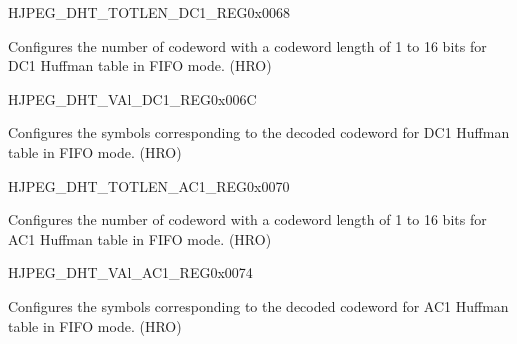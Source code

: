 \begin{register}{H}{JPEG\_DHT\_TOTLEN\_DC1\_REG}{0x0068}\label{regdesc:JPEGDHTTOTLENDC1REG}
%
\regnewline%
\begin{regdesc}\begin{reglist}
\label{fielddesc:JPEGDHTTOTLENDC1}\item [JPEG\_DHT\_TOTLEN\_DC1] Configures the number of codeword with a codeword length of 1 to 16 bits for DC1 Huffman table in FIFO mode. (HRO)
\end{reglist}\end{regdesc}
\end{register}


\begin{register}{H}{JPEG\_DHT\_VAl\_DC1\_REG}{0x006C}\label{regdesc:JPEGDHTVALDC1REG}
%
\regnewline%
\begin{regdesc}\begin{reglist}
\label{fielddesc:JPEGDHTVALDC1}\item [JPEG\_DHT\_VAL\_DC1] Configures the symbols corresponding to the decoded codeword for DC1 Huffman table in FIFO mode. (HRO)
\end{reglist}\end{regdesc}
\end{register}


\begin{register}{H}{JPEG\_DHT\_TOTLEN\_AC1\_REG}{0x0070}\label{regdesc:JPEGDHTTOTLENAC1REG}
%
\regnewline%
\begin{regdesc}\begin{reglist}
\label{fielddesc:JPEGDHTTOTLENAC1}\item [JPEG\_DHT\_TOTLEN\_AC1] Configures the number of codeword with a codeword length of 1 to 16 bits for AC1 Huffman table in FIFO mode. (HRO)
\end{reglist}\end{regdesc}
\end{register}


\begin{register}{H}{JPEG\_DHT\_VAl\_AC1\_REG}{0x0074}\label{regdesc:JPEGDHTVALAC1REG}
%
\regnewline%
\begin{regdesc}\begin{reglist}
\label{fielddesc:JPEGDHTVALAC1}\item [JPEG\_DHT\_VAL\_AC1] Configures the symbols corresponding to the decoded codeword for AC1 Huffman table in FIFO mode. (HRO)
\end{reglist}\end{regdesc}
\end{register}


